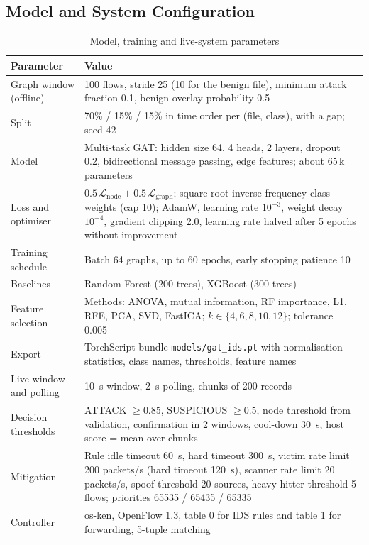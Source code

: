 \begin{appendices}
\section{Model and System Configuration}
\begin{table}[htbp]
\centering
\caption{Model, training and live-system parameters}
\label{tab:cfg}
\small
\begin{tabularx}{\textwidth}{|p{4.6cm}|X|}
\hline
\textbf{Parameter} & \textbf{Value} \\ \hline
Graph window (offline) & 100 flows, stride 25 (10 for the benign file), minimum attack fraction 0.1, benign overlay probability 0.5 \\ \hline
Split & 70\% / 15\% / 15\% in time order per (file, class), with a gap; seed 42 \\ \hline
Model & Multi-task GAT: hidden size 64, 4 heads, 2 layers, dropout 0.2, bidirectional message passing, edge features; about 65\,k parameters \\ \hline
Loss and optimiser & $0.5\,\mathcal{L}_{\text{node}}+0.5\,\mathcal{L}_{\text{graph}}$; square-root inverse-frequency class weights (cap 10); AdamW, learning rate $10^{-3}$, weight decay $10^{-4}$, gradient clipping 2.0, learning rate halved after 5 epochs without improvement \\ \hline
Training schedule & Batch 64 graphs, up to 60 epochs, early stopping patience 10 \\ \hline
Baselines & Random Forest (200 trees), XGBoost (300 trees) \\ \hline
Feature selection & Methods: ANOVA, mutual information, RF importance, L1, RFE, PCA, SVD, FastICA; $k\in\{4,6,8,10,12\}$; tolerance 0.005 \\ \hline
Export & TorchScript bundle \texttt{models/gat\_ids.pt} with normalisation statistics, class names, thresholds, feature names \\ \hline
Live window and polling & 10~s window, 2~s polling, chunks of 200 records \\ \hline
Decision thresholds & ATTACK $\ge 0.85$, SUSPICIOUS $\ge 0.5$, node threshold from validation, confirmation in 2 windows, cool-down 30~s, host score = mean over chunks \\ \hline
Mitigation & Rule idle timeout 60~s, hard timeout 300~s, victim rate limit 200 packets/s (hard timeout 120~s), scanner rate limit 20 packets/s, spoof threshold 20 sources, heavy-hitter threshold 5 flows; priorities 65535 / 65435 / 65335 \\ \hline
Controller & os-ken, OpenFlow 1.3, table 0 for IDS rules and table 1 for forwarding, 5-tuple matching \\ \hline
\end{tabularx}
\end{table}


\end{appendices}
